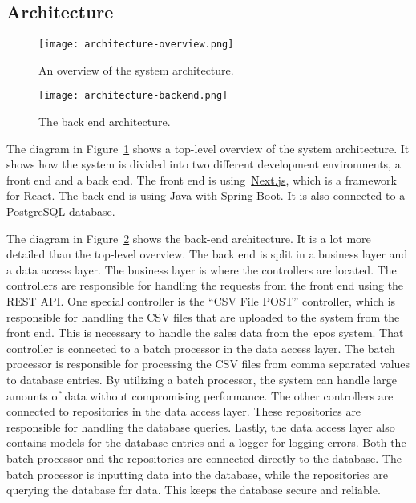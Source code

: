 \subsection{Architecture}\label{subsec:architecture}

\begin{figure}[H]
    \centering
    \texttt{[image: architecture-overview.png]}
    \caption{An overview of the system architecture.
    }\label{fig:architecture-overview}
\end{figure}

\begin{figure}[H]
    \centering
    \texttt{[image: architecture-backend.png]}
    \caption{The back end architecture.
    }\label{fig:architecture-backend}
\end{figure}

The diagram in Figure~\ref{fig:architecture-overview} shows a top-level overview of the system architecture.
It shows how the system is divided into two different development environments, a front end and a back end.
The front end is using~\url{Next.js}, which is a framework for React.
The back end is using Java with Spring Boot.
It is also connected to a PostgreSQL database.

The diagram in Figure~\ref{fig:architecture-backend} shows the back-end architecture.
It is a lot more detailed than the top-level overview.
The back end is split in a business layer and a data access layer.
The business layer is where the controllers are located.
The controllers are responsible for handling the requests from the front end using the REST API.\@
One special controller is the ``CSV File POST'' controller, which is responsible for handling the CSV files that
are uploaded to the system from the front end.
This is necessary to handle the sales data from the~\acrshort{epos} system.
That controller is connected to a batch processor in the data access layer.
The batch processor is responsible for processing the CSV files from comma separated values to database entries.
By utilizing a batch processor, the system can handle large amounts of data without compromising performance.
The other controllers are connected to repositories in the data access layer.
These repositories are responsible for handling the database queries.
Lastly, the data access layer also contains models for the database entries and a logger for logging errors.
Both the batch processor and the repositories are connected directly to the database.
The batch processor is inputting data into the database, while the repositories are querying the database for data.
This keeps the database secure and reliable.
